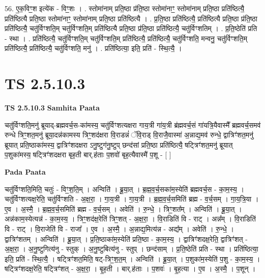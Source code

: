 \documentclass[17pt]{extarticle}
\begin{document}
56. ए॒क॒विꣳ॒॒श इत्ये॑क - विꣳ॒॒शः । . स्तोमा॑नाम् प्रति॒ष्ठा प्र॑ति॒ष्ठा स्तोमा॑नाꣳ॒॒ स्तोमा॑नाम् प्रति॒ष्ठा प्रति॑ष्ठित्यै॒ प्रति॑ष्ठित्यै प्रति॒ष्ठा स्तोमा॑नाꣳ॒॒ स्तोमा॑नाम् प्रति॒ष्ठा प्रति॑ष्ठित्यै । . प्र॒ति॒ष्ठा प्रति॑ष्ठित्यै॒ प्रति॑ष्ठित्यै प्रति॒ष्ठा प्र॑ति॒ष्ठा प्रति॑ष्ठित्यै॒ चतु॑र्विꣳशति॒म् चतु॑र्विꣳशति॒म् प्रति॑ष्ठित्यै प्रति॒ष्ठा प्र॑ति॒ष्ठा प्रति॑ष्ठित्यै॒ चतु॑र्विꣳशतिम् । . प्र॒ति॒ष्ठेति॑ प्रति - स्था । . प्रति॑ष्ठित्यै॒ चतु॑र्विꣳशति॒म् चतु॑र्विꣳशति॒म् प्रति॑ष्ठित्यै॒ प्रति॑ष्ठित्यै॒ चतु॑र्विꣳशति॒ मन्वनु॒ चतु॑र्विꣳशति॒म् प्रति॑ष्ठित्यै॒ प्रति॑ष्ठित्यै॒ चतु॑र्विꣳशति॒ मनु॑ । . प्रति॑ष्ठित्या॒ इति॒ प्रति॑ - स्थि॒त्यै॒ । \newline
\pagebreak
{}

\section{ TS 2.5.10.3 }

\textbf{TS 2.5.10.3 } \newline
\textbf{Samhita Paata} \newline

चतु॑र्विꣳशति॒मनु॑ ब्रूयाद्-ब्रह्मवर्च॒स-का॑मस्य॒ चतु॑र्विꣳशत्यक्षरा गाय॒त्री गा॑य॒त्री ब्र॑ह्मवर्च॒सं गा॑यत्रि॒यैवास्मै᳚ ब्रह्मवर्च॒समव॑ रुन्धे त्रिꣳ॒॒शत॒मनु॑ ब्रूया॒दन्न॑कामस्य त्रिꣳ॒॒शद॑क्षरा वि॒राडन्नं॑ ॅवि॒राड् वि॒राजै॒वास्मा॑ अ॒न्नाद्य॒मव॑ रुन्धे॒ द्वात्रिꣳ॑शत॒मनु॑ ब्रूयात् प्रति॒ष्ठाका॑मस्य॒ द्वात्रिꣳ॑शदक्षरा ऽनु॒ष्टुग॑नु॒ष्टुप् छन्द॑सां प्रति॒ष्ठा प्रति॑ष्ठित्यै॒ षट्त्रिꣳ॑शत॒मनु॑ ब्रूयात् प॒शुका॑मस्य॒ षट्त्रिꣳ॑शदक्षरा बृह॒ती बार्.ह॑ताः प॒शवो॑ बृह॒त्यैवास्मै॑ प॒शू - [  ] \newline

\textbf{Pada Paata} \newline

चतु॑र्विꣳशति॒मिति॒ चतुः॑ - विꣳ॒॒श॒ति॒म् । अन्विति॑ । ब्रू॒या॒त् । ब्र॒ह्म॒व॒र्च॒सका॑म॒स्येति॑ ब्रह्मवर्च॒स - का॒म॒स्य॒ । चतु॑र्विꣳशत्यक्ष॒रेति॒ चतु॑र्विꣳशति - अ॒क्ष॒रा॒ । गा॒य॒त्री । गा॒य॒त्री । ब्र॒ह्म॒व॒र्च॒समिति॑ ब्रह्म - व॒र्च॒सम् । गा॒य॒त्रि॒या । ए॒व । अ॒स्मै॒ । ब्र॒ह्म॒व॒र्च॒समिति॑ ब्रह्म - व॒र्च॒सम् । अवेति॑ । रु॒न्धे॒ । त्रिꣳ॒॒शत᳚म् । अन्विति॑ । ब्रू॒या॒त् । अन्न॑काम॒स्येत्यन्न॑ - का॒म॒स्य॒ । त्रिꣳ॒॒शद॑क्ष॒रेति॑ त्रिꣳ॒॒शत् - अ॒क्ष॒रा॒ । वि॒राडिति॑ वि - राट् । अन्न᳚म् । वि॒राडिति॑ वि - राट् । वि॒राजेति॑ वि - राजा᳚ । ए॒व । अ॒स्मै॒ । अ॒न्नाद्य॒मित्य॑न्न - अद्य᳚म् । अवेति॑ । रु॒न्धे॒ । द्वात्रिꣳ॑शतम् । अन्विति॑ । ब्रू॒या॒त् । प्र॒ति॒ष्ठाका॑म॒स्येति॑ प्रति॒ष्ठा - का॒म॒स्य॒ । द्वात्रिꣳ॑शदक्ष॒रेति॒ द्वात्रिꣳ॑शत् - अ॒क्ष॒रा॒ । अ॒नु॒ष्टुगित्य॑नु - स्तुक् । अ॒नु॒ष्टुबित्य॑नु - स्तुप् । छन्द॑साम् । प्र॒ति॒ष्ठेति॑ प्रति - स्था । प्रति॑ष्ठित्या॒ इति॒ प्रति॑ - स्थि॒त्यै॒ । षट्त्रिꣳ॑शत॒मिति॒ षट्-त्रिꣳ॒॒श॒त॒म् । अन्विति॑ । ब्रू॒या॒त् । प॒शुका॑म॒स्येति॑ प॒शु - का॒म॒स्य॒ । षट्त्रिꣳ॑शदक्ष॒रेति॒ षट्त्रिꣳ॑शत् - अ॒क्ष॒रा॒ । बृ॒ह॒ती । बार्.ह॑ताः । प॒शवः॑ । बृ॒ह॒त्या । ए॒व । अ॒स्मै॒ । प॒शून् ।  \newline
\end{document}
